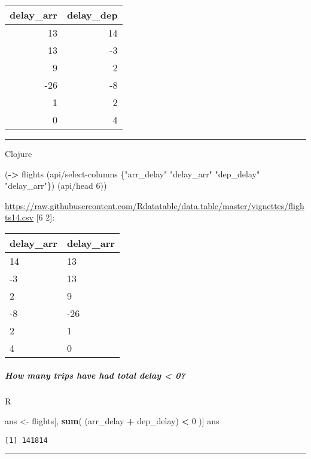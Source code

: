 \documentclass[]{article}
\newenvironment{Shaded}{\begin{snugshade}}{\end{snugshade}}
\newcommand{\DecValTok}[1]{\textcolor[rgb]{0.00,0.00,0.81}{#1}}
\newcommand{\KeywordTok}[1]{\textcolor[rgb]{0.13,0.29,0.53}{\textbf{#1}}}
\newcommand{\NormalTok}[1]{#1}
\newcommand{\OperatorTok}[1]{\textcolor[rgb]{0.81,0.36,0.00}{\textbf{#1}}}
\newcommand{\StringTok}[1]{\textcolor[rgb]{0.31,0.60,0.02}{#1}}
\let\oldsubparagraph\subparagraph
\renewcommand{\subparagraph}[1]{\oldsubparagraph{#1}\mbox{}}
\begin{document}
\begin{longtable}[]{@{}rr@{}}
\toprule
delay\_arr & delay\_dep\tabularnewline
\midrule
\endhead
13 & 14\tabularnewline
13 & -3\tabularnewline
9 & 2\tabularnewline
-26 & -8\tabularnewline
1 & 2\tabularnewline
0 & 4\tabularnewline
\bottomrule
\end{longtable}

\begin{center}\rule{0.5\linewidth}{0.5pt}\end{center}

Clojure

\begin{Shaded}
\begin{Highlighting}[]
\NormalTok{(}\KeywordTok{->}\NormalTok{ flights}
\NormalTok{    (api/select-columns \{}\StringTok{"arr_delay"} \StringTok{"delay_arr"}
                         \StringTok{"dep_delay"} \StringTok{"delay_arr"}\NormalTok{\})}
\NormalTok{    (api/head }\DecValTok{6}\NormalTok{))}
\end{Highlighting}
\end{Shaded}

\url{https://raw.githubusercontent.com/Rdatatable/data.table/master/vignettes/flights14.csv}
{[}6 2{]}:

\begin{longtable}[]{@{}ll@{}}
\toprule
delay\_arr & delay\_arr\tabularnewline
\midrule
\endhead
14 & 13\tabularnewline
-3 & 13\tabularnewline
2 & 9\tabularnewline
-8 & -26\tabularnewline
2 & 1\tabularnewline
4 & 0\tabularnewline
\bottomrule
\end{longtable}

\hypertarget{how-many-trips-have-had-total-delay-0}{%
\subparagraph{How many trips have had total delay \textless{}
0?}\label{how-many-trips-have-had-total-delay-0}}

R

\begin{Shaded}
\begin{Highlighting}[]
\NormalTok{ans <-}\StringTok{ }\NormalTok{flights[, }\KeywordTok{sum}\NormalTok{( (arr_delay }\OperatorTok{+}\StringTok{ }\NormalTok{dep_delay) }\OperatorTok{<}\StringTok{ }\DecValTok{0}\NormalTok{ )]}
\NormalTok{ans}
\end{Highlighting}
\end{Shaded}

\begin{verbatim}
[1] 141814
\end{verbatim}

\begin{center}\rule{0.5\linewidth}{0.5pt}\end{center}
\end{document}
